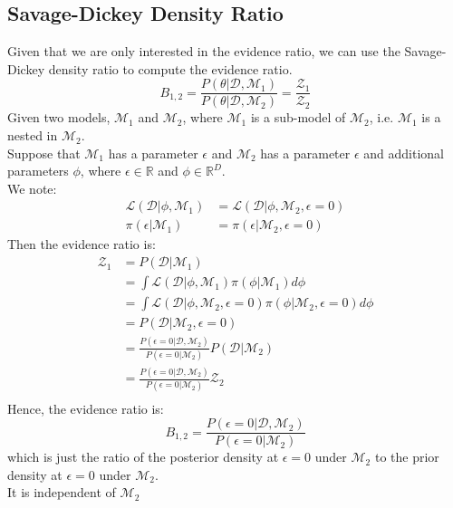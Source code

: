 \documentclass[12pt,a4paper]{article}
\begin{document}
\subsection{Savage-Dickey Density Ratio}
Given that we are only interested in the evidence ratio, we can use the Savage-Dickey density ratio to compute the evidence ratio.\\
$$
    B_{1,2} = \frac{P(\theta|\mathcal{D}, \mathcal{M}_1)}{P(\theta|\mathcal{D}, \mathcal{M}_2)} = \frac{\mathcal{Z}_1}{\mathcal{Z}_2}
$$
Given two models, $\mathcal{M}_1$ and $\mathcal{M}_2$, where $\mathcal{M}_1$ is a sub-model of $\mathcal{M}_2$, i.e. $\mathcal{M}_1$ is a nested in $\mathcal{M}_2$.\\
Suppose that $\mathcal{M}_1$ has a parameter $\epsilon$ and $\mathcal{M}_2$ has a parameter $\epsilon$ and additional parameters $\phi$, where $\epsilon \in \mathbb{R}$ and $\phi \in \mathbb{R}^D$.\\
We note:
\begin{align*}
    \mathcal{L}(\mathcal{D}|\phi, \mathcal{M}_1) &= \mathcal{L}(\mathcal{D}|\phi, \mathcal{M}_2, \epsilon = 0) \\
    \pi(\epsilon|\mathcal{M}_1) &= \pi(\epsilon|\mathcal{M}_2, \epsilon = 0)
\end{align*}
Then the evidence ratio is:
\begin{align*}
    {\mathcal{Z}_1} &= P(\mathcal{D}|\mathcal{M}_1)\\
    &= \int \mathcal{L}(\mathcal{D}|\phi, \mathcal{M}_1) \pi(\phi|\mathcal{M}_1) d\phi\\
    &= \int \mathcal{L}(\mathcal{D}|\phi, \mathcal{M}_2, \epsilon = 0) \pi(\phi|\mathcal{M}_2, \epsilon = 0) d\phi\\
    &= P(\mathcal{D}|\mathcal{M}_2, \epsilon = 0)\\
    &= \frac{P(\epsilon = 0|\mathcal{D}, \mathcal{M}_2)}{P(\epsilon = 0|\mathcal{M}_2)}P(\mathcal{D}|\mathcal{M}_2)\\
    &= \frac{P(\epsilon = 0|\mathcal{D}, \mathcal{M}_2)}{P(\epsilon = 0|\mathcal{M}_2)}\mathcal{Z_2}\\
\end{align*}
Hence, the evidence ratio is:
$$
    B_{1,2} = \frac{P(\epsilon = 0|\mathcal{D}, \mathcal{M}_2)}{P(\epsilon = 0|\mathcal{M}_2)}
$$
which is just the ratio of the posterior density at $\epsilon = 0$ under $\mathcal{M}_2$ to the prior density at $\epsilon = 0$ under $\mathcal{M}_2$.\\
It is independent of $\mathcal{M}_2$
\end{document}
